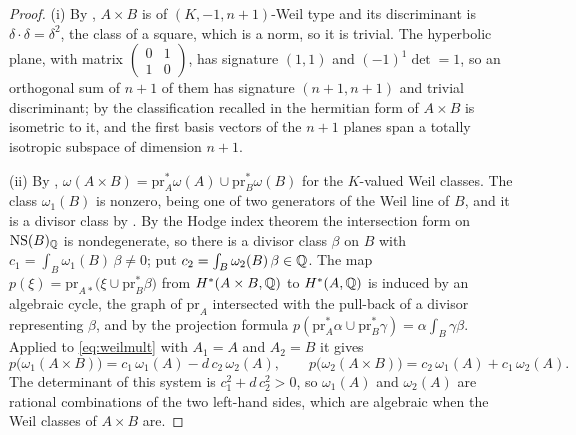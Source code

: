 \begin{proof}
(i) By , $A\times B$ is of $(K,-1,n+1)$-Weil type and its
discriminant is $\delta\cdot\delta=\delta^{2}$, the class of a square, which
is a norm, so it is trivial. The hyperbolic plane, with matrix
$\left(\begin{smallmatrix}0&1\\1&0\end{smallmatrix}\right)$, has signature
$(1,1)$ and $(-1)^{1}\det=1$, so an orthogonal sum of $n+1$ of them has
signature $(n+1,n+1)$ and trivial discriminant; by the classification
recalled in  the hermitian form of $A\times B$ is isometric
to it, and the first basis vectors of the $n+1$ planes span a totally
isotropic subspace of dimension $n+1$.

(ii) By ,
$\omega(A\times B)=\mathrm{pr}_{A}^{*}\omega(A)\cup\mathrm{pr}_{B}^{*}\omega(B)$
for the $K$-valued Weil classes. The class $\omega_{1}(B)$ is nonzero, being
one of two generators of the Weil line of $B$, and it is a divisor class by
. By the Hodge index theorem the intersection form on
$\mathrm{NS}(B)_{\mathbb{Q}}$ is nondegenerate, so there is a divisor class $\beta$ on $B$
with $c_{1}=\int_{B}\omega_{1}(B)\,\beta\ne0$; put
$c_{2}=\int_{B}\omega_{2}(B)\,\beta\in\mathbb{Q}$. The map
$p(\xi)=\mathrm{pr}_{A*}\bigl(\xi\cup\mathrm{pr}_{B}^{*}\beta\bigr)$ from
$H^{*}(A\times B,\mathbb{Q})$ to $H^{*}(A,\mathbb{Q})$ is induced by an algebraic cycle,
the graph of $\mathrm{pr}_{A}$ intersected with the pull-back of a divisor
representing $\beta$, and by the projection formula
$p(\mathrm{pr}_{A}^{*}\alpha\cup\mathrm{pr}_{B}^{*}\gamma)=\alpha\int_{B}
\gamma\beta$. Applied to \eqref{eq:weilmult} with $A_{1}=A$ and $A_{2}=B$ it
gives
\[
  p\bigl(\omega_{1}(A\times B)\bigr)=c_{1}\,\omega_{1}(A)-d\,c_{2}\,\omega_{2}(A),
  \qquad
  p\bigl(\omega_{2}(A\times B)\bigr)=c_{2}\,\omega_{1}(A)+c_{1}\,\omega_{2}(A).
\]
The determinant of this system is $c_{1}^{2}+d\,c_{2}^{2}>0$, so
$\omega_{1}(A)$ and $\omega_{2}(A)$ are rational combinations of the two
left-hand sides, which are algebraic when the Weil classes of $A\times B$
are.
\end{proof}

